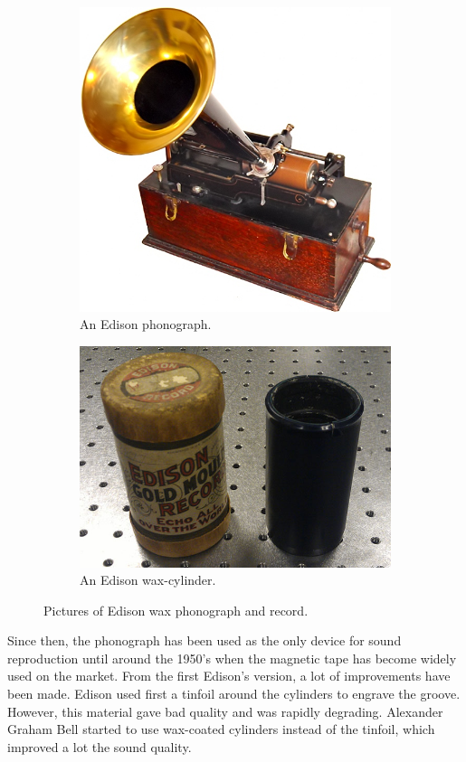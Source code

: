 \begin{figure}[!ht]
    \begin{subfigure}[b]{0.49\textwidth}
    \centering
    \includegraphics[height=0.5\textwidth]{images/edison-phonograph}
    \caption{An Edison phonograph.}
    \label{fig:edisonphono}
    \end{subfigure}
    \begin{subfigure}[b]{0.49\textwidth}
    \centering
    \includegraphics[height=0.5\textwidth]{images/edison-cylinder}
    \caption{An Edison wax-cylinder.}
    \label{fig:edisoncyl}
    \end{subfigure}
    \caption{Pictures of Edison wax phonograph and record.}
    \label{fig:edisonphonocyl}
\end{figure}

Since then, the phonograph has been used as the only device for sound reproduction until around the 1950's when the magnetic tape has become widely used on the market. From the first Edison's version, a lot of improvements have been made. Edison used first a tinfoil around the cylinders to engrave the groove. However, this material gave bad quality and was rapidly degrading. Alexander Graham Bell started to use wax-coated cylinders instead of the tinfoil, which improved a lot the sound quality.

